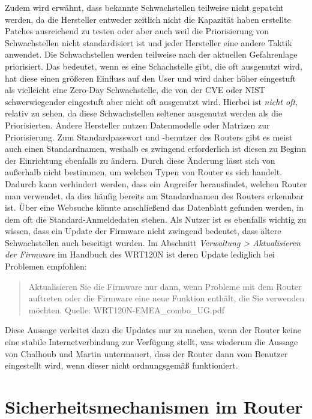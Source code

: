 	Zudem wird erwähnt, dass bekannte Schwachstellen teilweise
	nicht gepatcht werden, da die Hersteller entweder zeitlich nicht die 
	Kapazität haben erstellte Patches ausreichend zu testen oder aber auch 
	weil die Priorisierung von Schwachstellen nicht standardisiert ist und jeder
	Hersteller eine andere Taktik anwendet. Die Schwachstellen werden teilweise
	nach der aktuellen Gefahrenlage priorisiert. Das bedeutet, wenn es eine Schachstelle
	gibt, die oft ausgenutzt wird, hat diese einen größeren Einfluss
	auf den User und wird daher höher eingestuft als vielleicht eine Zero-Day
	Schwachstelle, die von der CVE oder NIST schwerwiegender eingestuft aber nicht
	oft ausgenutzt wird. Hierbei ist \emph{nicht oft}, relativ zu sehen, da diese
	Schwachstellen seltener ausgenutzt werden als die Priorisierten.
	Andere Hersteller nutzen Datenmodelle oder Matrizen zur Priorisierung.
	\newline
	Zum Standardpasswort und -benutzer des Routers gibt es meist auch einen Standardnamen, 
	weshalb es zwingend erforderlich ist diesen zu Beginn der Einrichtung 
	ebenfalls zu ändern. Durch diese Änderung lässt sich von außerhalb nicht
	bestimmen, um welchen Typen von Router es sich handelt. Dadurch kann 
	verhindert werden, dass ein Angreifer herausfindet, welchen Router 
	man verwendet, da dies häufig bereits am Standardnamen des Routers 
	erkennbar ist. Über eine Websuche könnte anschließend das Datenblatt
	gefunden werden, in dem oft die Standard-Anmeldedaten stehen. 
	Als Nutzer ist es ebenfalls wichtig zu wissen, dass ein Update 
	der Firmware nicht zwingend bedeutet, dass ältere Schwachstellen auch 
	beseitigt wurden.\cite{chalhoub2023, schwarz2021, bsia}
	Im Abschnitt \emph{Verwaltung > Aktualisieren der Firmware} im Handbuch des 
	WRT120N ist	deren Update lediglich bei Problemen empfohlen:
	\begin{quote}
		Aktualisieren Sie die Firmware nur dann, wenn Probleme mit dem 
		Router auftreten oder die Firmware eine neue Funktion enthält, die Sie
		verwenden möchten.
		Quelle: WRT120N-EMEA\_combo\_UG.pdf
	\end{quote}
	Diese Aussage verleitet dazu die Updates nur zu machen, wenn der 
	Router keine eine stabile Internetverbindung zur Verfügung stellt,
	was wiederum die Aussage von Chalhoub und Martin \cite{chalhoub2023} 
	untermauert, dass der Router dann vom Benutzer eingestellt wird,
	wenn dieser nicht ordnungsgemäß funktioniert.



	\section{Sicherheitsmechanismen im Router}

